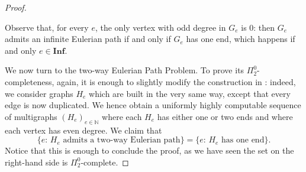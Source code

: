 \documentclass[10pt,A4]{amsart}
\theoremstyle{definition}
\theoremstyle{definition}
\newcommand{\N}{\mathbb{N}}
\begin{document}
\begin{proof}
\begin{tcolorbox}
\begin{center}
        \end{center}
    \end{tcolorbox}
 

    Observe that, for every $e$, the only vertex with odd degree in $G_e$ is $0$: then $G_e$ admits an infinite Eulerian path if and only if $G_e$ has one end, which happens if and only $e \in \textbf{Inf}$.

    We now turn to the two-way Eulerian Path Problem. To prove its $\Pi_2^0$-completeness, again, it is enough to slightly modify the construction in : indeed, we consider graphs $H_e$ which are built in the very same way, except that every edge is now duplicated.  We hence obtain a uniformly highly computable sequence of multigraphs $(H_e)_{e \in \N}$ where each $H_e$ has either one or two ends and where each vertex has even degree. We claim that 
    $$\{e: \, H_e \text{ admits a two-way Eulerian path}\} = \{e: \, H_e \text{ has one end}\}.$$
    Notice that this is enough to conclude the proof, as we have seen the set on the right-hand side is $\Pi_2^0$-complete.


\end{proof}
\end{document}

